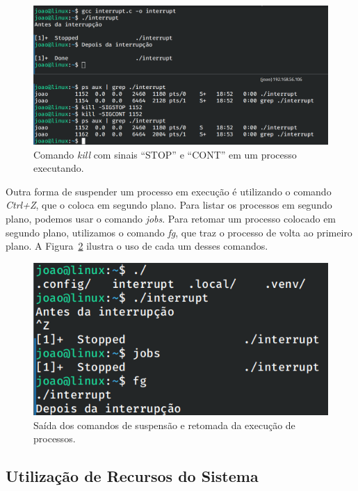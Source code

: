 \documentclass[
	12pt,				%
	oneside,   	        %
	a4paper,			%
	english,			%
	french,				%
	spanish,			%
	brazil,				%
	]{pacotes/abntex2}
\begin{document}
\begin{figure}[H]
  \centering
  \includegraphics[scale=0.45]{figuras/signal.png}
  \caption{Comando \textit{kill} com sinais ``STOP'' e ``CONT'' em um processo executando.}
  \label{fig:signal}
\end{figure}

Outra forma de suspender um processo em execução é utilizando o comando \textit{Ctrl+Z}, que o coloca em segundo plano. Para listar os processos em segundo plano, podemos usar o comando \textit{jobs}. Para retomar um processo colocado em segundo plano, utilizamos o comando \textit{fg}, que traz o processo de volta ao primeiro plano. A Figura~\ref{fig:background} ilustra o uso de cada um desses comandos.

\begin{figure}[H]
  \centering
  \includegraphics[scale=0.45]{figuras/background.png}
  \caption{Saída dos comandos de suspensão e retomada da execução de processos.}
  \label{fig:background}
\end{figure}

\subsection{Utilização de Recursos do Sistema}
\label{subsec:recursos}
\end{document}
